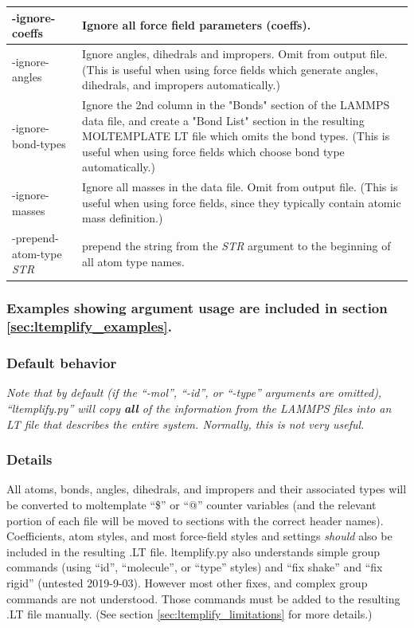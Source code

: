 \documentclass[11pt]{article}
\begin{document}
\begin{tabular}[h]{l|p{10cm}}
-ignore-coeffs
&
Ignore all force field parameters (coeffs).
\\
\hline

-ignore-angles
&
Ignore angles, dihedrals and impropers.  Omit from output file.
(This is useful when using force fields which generate angles, dihedrals, and impropers automatically.)
\\
\hline

-ignore-bond-types
&
Ignore the 2nd column in the "Bonds" section of the LAMMPS data file,
and create a "Bond List" section in the resulting MOLTEMPLATE LT file
which omits the bond types.
(This is useful when using force fields which choose bond type automatically.)
\\
\hline

-ignore-masses
&
Ignore all masses in the data file.  Omit from output file.
(This is useful when using force fields, since they typically contain atomic mass definition.)
\\
\hline

-prepend-atom-type \textit{STR}
&
prepend the string from the \textit{STR} argument to the beginning of
all atom type names.
\\
\hline
\end{tabular}


\subsubsection*{Examples showing argument usage are included
                in section \ref{sec:ltemplify_examples}.}

\pagebreak


\subsubsection*{Default behavior}
\textit{Note that by default
(if the ``-mol'', ``-id'', or ``-type'' arguments are omitted),
``ltemplify.py'' will copy \textbf{all} of the information
from the LAMMPS files into an LT file that describes the entire system.
Normally, this is not very useful.}



\subsubsection*{Details}

All atoms, bonds, angles, dihedrals, and impropers and their associated
types will be converted to moltemplate ``\$'' or ``@'' counter variables
(and the relevant portion of each file will be moved to sections
with the correct header names).
Coefficients, atom styles, and most force-field styles and
settings \textit{should} also be included in the resulting .LT file.
ltemplify.py also understands simple group commands
(using ``id'', ``molecule'', or ``type'' styles)
and ``fix shake'' and ``fix rigid''  (untested 2019-9-03).
However most other fixes, and complex group commands are not understood.
Those commands must be added to the resulting .LT file manually.
(See section \ref{sec:ltemplify_limitations} for more details.)
\end{document}
